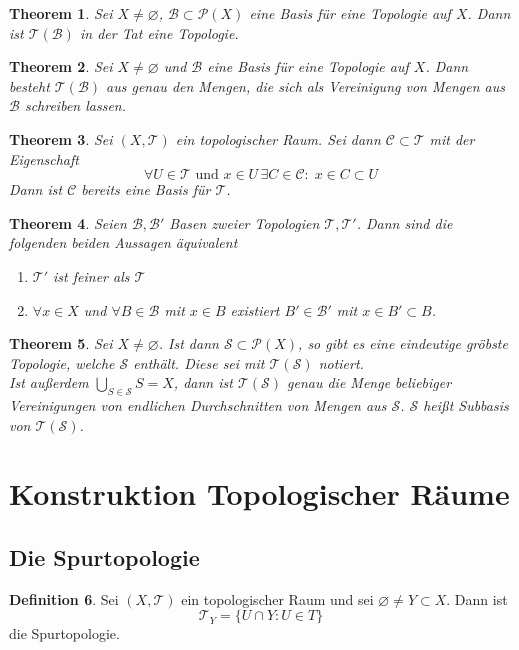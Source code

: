 \documentclass[a4paper, 12pt]{article}
\theoremstyle{plain}
\newtheorem{theorem}{Theorem}[section] %
\theoremstyle{definition}
\newtheorem{definition}[theorem]{Definition} %
\theoremstyle{lemma}
\theoremstyle{remark}
\theoremstyle{corollary}
\theoremstyle{example}
\begin{document}
	\begin{theorem}
		Sei $X \neq \varnothing$, $\mathcal{B} \subset \mathcal{P}(X)$ eine Basis für eine Topologie auf $X$. Dann ist $\mathcal{T}(\mathcal{B})$ in der Tat eine Topologie.
	\end{theorem}
	\begin{theorem}
		Sei $X \neq \varnothing$ und $\mathcal{B}$ eine Basis für eine Topologie auf $X$. Dann besteht $\mathcal{T}(\mathcal{B})$ aus genau den Mengen, die sich als Vereinigung von Mengen aus $\mathcal{B}$ schreiben lassen.
	\end{theorem}
	\begin{theorem}
		Sei $(X,\mathcal{T})$ ein topologischer Raum. Sei dann $\mathcal{C} \subset \mathcal{T}$ mit der Eigenschaft \[\forall U \in \mathcal{T} \text{ und } x \in U \, \exists C \in \mathcal{C}: \; x \in C \subset U\]
		Dann ist $\mathcal{C}$ bereits eine Basis für $\mathcal{T}$.
	\end{theorem}
	\begin{theorem}
		Seien $\mathcal{B}, \mathcal{B}'$ Basen zweier Topologien $\mathcal{T}, \mathcal{T}'$. Dann sind die folgenden beiden Aussagen äquivalent \begin{enumerate}
			\item $\mathcal{T}'$ ist feiner als $\mathcal{T}$
			\item $\forall x \in X$ und $\forall B \in \mathcal{B}$ mit $x\in B$ existiert $B'\in \mathcal{B}'$ mit $x\in B' \subset B$.
		\end{enumerate}
	\end{theorem}
	\begin{theorem}
		Sei $X \neq \varnothing$. Ist dann $\mathcal{S}\subset \mathcal{P}(X)$, so gibt es eine eindeutige gröbste Topologie, welche $\mathcal{S}$ enthält. Diese sei mit $\mathcal{T}(\mathcal{S})$ notiert.\\
		Ist außerdem $\bigcup_{S \in \mathcal{S}} S = X$, dann ist $\mathcal{T}(\mathcal{S})$ genau die Menge beliebiger Vereinigungen von endlichen Durchschnitten von Mengen aus $\mathcal{S}$. $\mathcal{S}$ heißt Subbasis von $\mathcal{T}(\mathcal{S})$.
	\end{theorem}
	\section{Konstruktion Topologischer Räume}
	\subsection{Die Spurtopologie}
	\begin{definition}
		Sei $(X,\mathcal{T})$ ein topologischer Raum und sei $\varnothing \neq Y \subset X$. Dann ist \[\mathcal{T}_Y = \{U \cap Y: U \in T\}\] die Spurtopologie.
	\end{definition}
\end{document}
